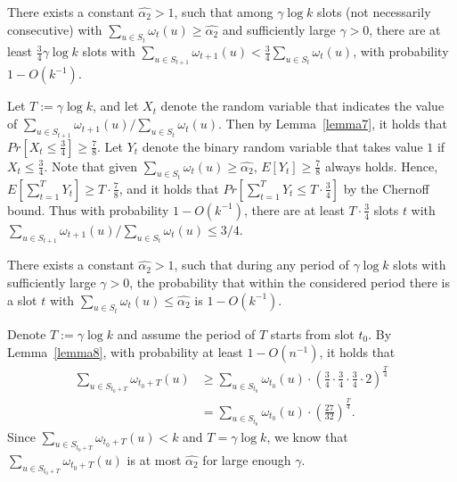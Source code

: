 \begin{lemma}
    \label{lemma8}
    There exists a constant $\hat{\alpha_2} > 1$,
    such that among $\gamma\log k$ slots (not necessarily consecutive)
    with ${\sum}_{u\in S_t}\omega_t(u) \geq \hat{\alpha_2}$ and sufficiently
    large $\gamma > 0$, there are at least $\frac{3}{4}\gamma\log k$ slots
    with ${\sum}_{u\in S_{t+1}}\omega_{t+1}(u) < \frac{3}{4}{\sum}_{u\in S_t}\omega_t(u)$,
    with probability $1-O(k^{-1})$.
\end{lemma}
\begin{IEEEproof}
    Let $T := \gamma\log k$, and let $X_t$ denote the random variable that indicates the value of 
    ${\sum}_{u\in S_{t+1}}\omega_{t+1}(u) / {\sum}_{u\in S_t}\omega_t(u)$. Then
    by Lemma~\ref{lemma7}, it holds that $Pr[X_t \leq \frac{3}{4}] \geq \frac{7}{8}$.
    Let $Y_t$ denote the binary random variable that takes value $1$ if $X_t \leq \frac{3}{4}$.
    Note that given ${\sum}_{u\in S_t}\omega_t(u) \geq \hat{\alpha_2}$, $E[Y_t] \geq \frac{7}{8}$
    always holds. Hence, $E[\sum_{t=1}^{T}Y_t] \geq T\cdot\frac{7}{8}$, and it holds that
    $Pr[\sum_{t=1}^{T}Y_t\leq T\cdot\frac{3}{4}]$ by the Chernoff bound. Thus with probability 
    $1-O(k^{-1})$, there are at least $T\cdot\frac{3}{4}$ slots $t$ with 
    ${\sum}_{u\in S_{t+1}}\omega_{t+1}(u) / {\sum}_{u\in S_t}\omega_t(u) \leq 3/4$. 
\end{IEEEproof}


\begin{lemma}
    \label{lemma9}
    There exists a constant $\hat{\alpha_2} > 1$, such that
    during any period of $\gamma\log k$ slots with sufficiently large 
    $\gamma >0$, the probability that within the considered period there
    is a slot $t$ with ${\sum}_{u\in S_t}\omega_t(u) \leq \hat{\alpha_2}$
    is $1-O(k^{-1})$.
\end{lemma}

\begin{IEEEproof}
    Denote $T :=\gamma\log k$ and assume the period of $T$ starts from slot $t_0$.
    By Lemma~\ref{lemma8}, with probability at least $1-O(n^{-1})$, it holds that 
    \begin{align*}
        {\sum}_{u\in S_{t_0+T}}\omega_{t_0+T}(u)  &\geq 
        {\sum}_{u\in S_{t_0}}\omega_{t_0}(u)\cdot(\frac{3}{4}\cdot\frac{3}{4}
        \cdot\frac{3}{4}\cdot 2)^{\frac{T}{4}} \\
       &={\sum}_{u\in S_{t_0}}\omega_{t_0}(u)\cdot(\frac{27}{32})^{\frac{T}{4}}.
    \end{align*} 
    Since $\sum_{u\in S_{t_0+T}}\omega_{t_0+T}(u) < k$ and $T = \gamma\log k$,
    we know that $\sum_{u\in S_{t_0+T}}\omega_{t_0+T}(u)$ is at most $\hat{\alpha_2}$ 
    for large enough $\gamma$.
\end{IEEEproof}


